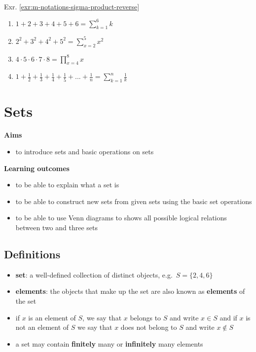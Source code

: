 \documentclass[
]{book}
\providecommand{\tightlist}{%
  \setlength{\itemsep}{0pt}\setlength{\parskip}{0pt}}
\theoremstyle{definition}
\theoremstyle{definition}
\theoremstyle{definition}
\theoremstyle{remark}
\begin{document}
Exr. \ref{exr:m-notations-sigma-product-reverse}

\begin{enumerate}
\def\labelenumi{\alph{enumi})}
\item
  \(1+2+3+4+5+6 = \displaystyle \sum_{k=1}^{6}k\)
\item
  \(2^2+3^2+4^2+5^2 = \displaystyle \sum_{x=2}^{5}x^2\)
\item
  \(4 \cdot 5 \cdot 6 \cdot 7 \cdot 8 = \displaystyle \prod_{x=4}^{8}x\)
\item
  \(1 + \frac{1}{2} + \frac{1}{3} + \frac{1}{4} + \frac{1}{5} + ... + \frac{1}{n} = \displaystyle \sum_{k=1}^{n}\frac{1}{k}\)
\end{enumerate}

\hypertarget{sets}{%
\chapter{Sets}\label{sets}}

\textbf{Aims}

\begin{itemize}
\tightlist
\item
  to introduce sets and basic operations on sets
\end{itemize}

\textbf{Learning outcomes}

\begin{itemize}
\tightlist
\item
  to be able to explain what a set is
\item
  to be able to construct new sets from given sets using the basic set operations
\item
  to be able to use Venn diagrams to shows all possible logical relations between two and three sets
\end{itemize}

\hypertarget{definitions}{%
\section{Definitions}\label{definitions}}

\begin{itemize}
\tightlist
\item
  \textbf{set}: a well-defined collection of distinct objects, e.g.~\(S = \{2, 4, 6\}\)
\item
  \textbf{elements}: the objects that make up the set are also known as \textbf{elements} of the set
\item
  if \(x\) is an element of \(S\), we say that \(x\) belongs to \(S\) and write \(x \in S\) and if \(x\) is not an element of \(S\) we say that \(x\) does not belong to \(S\) and write \(x \notin S\)
\item
  a set may contain \textbf{finitely} many or \textbf{infinitely} many elements
\end{itemize}
\end{document}
